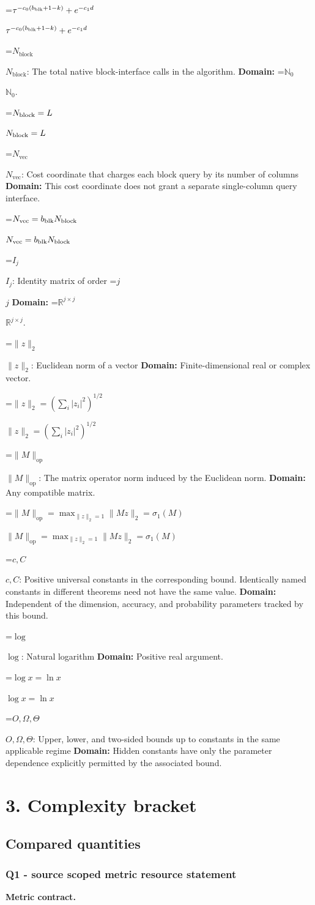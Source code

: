 \documentclass[10pt,a4paper]{article}
\newcommand{\AtlasMath}[1]{\par\begingroup\centering\setbox0=\hbox{$\displaystyle #1$}\ifdim\wd0>1.4\linewidth\typeout{ATLAS WIDE FORMULA: \the\wd0}\fi\ifdim\wd0>\linewidth\resizebox{\linewidth}{!}{\box0}\else\box0\fi\par\endgroup}
\newcommand{\AtlasInlineMath}[1]{\begingroup\setbox0=\hbox{$#1$}\ifdim\wd0>.4\linewidth\endgroup\AtlasMath{#1}\else\endgroup$#1$\fi}
\begin{document}
\AtlasInlineMath{\tau^{-c_0(b_{\rm blk}+1-k)}+e^{-c_1d}}

\AtlasInlineMath{N_{\mathrm{block}}}: The total native block-interface calls in the algorithm. \textbf{Domain:} \AtlasInlineMath{\mathbb N_0}.

\AtlasInlineMath{N_{\rm block}=L}

\AtlasInlineMath{N_{\mathrm{vec}}}: Cost coordinate that charges each block query by its number of columns \textbf{Domain:} This cost coordinate does not grant a separate single-column query interface.

\AtlasInlineMath{N_{\rm vec}=b_{\rm blk}N_{\rm block}}

\AtlasInlineMath{I_j}: Identity matrix of order \AtlasInlineMath{j} \textbf{Domain:} \AtlasInlineMath{\mathbb R^{j\times j}}.

\AtlasInlineMath{\|z\|_2}: Euclidean norm of a vector \textbf{Domain:} Finite-dimensional real or complex vector.

\AtlasInlineMath{\|z\|_2=(\sum_i|z_i|^2)^{1/2}}

\AtlasInlineMath{\|M\|_{\mathrm{op}}}: The matrix operator norm induced by the Euclidean norm. \textbf{Domain:} Any compatible matrix.

\AtlasInlineMath{\|M\|_{\mathrm{op}}=\max_{\|z\|_2=1}\|Mz\|_2=\sigma_1(M)}

\AtlasInlineMath{c,C}: Positive universal constants in the corresponding bound. Identically named constants in different theorems need not have the same value. \textbf{Domain:} Independent of the dimension, accuracy, and probability parameters tracked by this bound.

\AtlasInlineMath{\log}: Natural logarithm \textbf{Domain:} Positive real argument.

\AtlasInlineMath{\log x=\ln x}

\AtlasInlineMath{O,\Omega,\Theta}: Upper, lower, and two-sided bounds up to constants in the same applicable regime \textbf{Domain:} Hidden constants have only the parameter dependence explicitly permitted by the associated bound.

\section{3. Complexity bracket}
\subsection{Compared quantities}
\subsubsection{Q1 - source scoped metric resource statement}
\textbf{Metric contract.}
\end{document}
